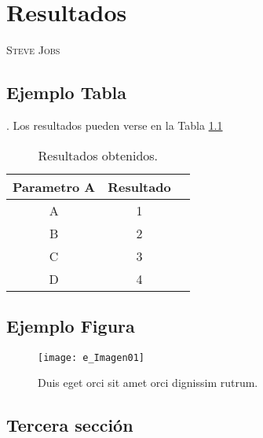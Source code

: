 \chapter{Resultados}
              {\textsc{Steve Jobs}}

\section{Ejemplo Tabla}
\lipsum[1].  
Los resultados pueden verse en la Tabla \ref{tab:Tabla1}

\begin{table}[htbp]
\centering
\caption{Resultados obtenidos.}
\label{tab:pversust}
\begin{tabular}{ccc}
\toprule
\textbf{Parametro A } & \textbf{Resultado } \\
\midrule
A & 1 \\
B & 2 \\ 
C & 3 \\
D & 4 \\
\bottomrule
\end{tabular}
\label{tab:Tabla1}
\end{table}

\lipsum[2]

\section{Ejemplo Figura}
\lipsum[3-4]

\begin{figure}[htbp]
\centering
\texttt{[image: e\_Imagen01]}
\caption{Duis eget orci sit amet orci dignissim rutrum.}
\label{fig:particion}
\end{figure}

\section{Tercera sección}
\lipsum[5-6]
